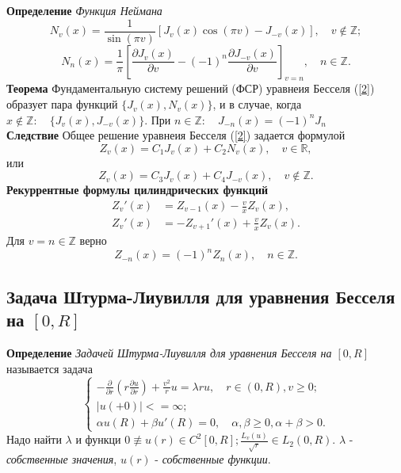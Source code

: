\documentclass{article}
\begin{document}
\noindent\textbf{Определение} \emph{Функция Неймана}
\begin{equation}
N_v(x)=\frac{1}{\sin(\pi v)}[J_v(x)\cos(\pi v)-J_{-v}(x)],\quad v\notin \mathbb{Z};
\end{equation}
\begin{equation}
N_n(x)=\frac{1}{\pi} \left[\frac{\partial J_v(x)}{\partial v}-(-1)^n\frac{\partial J_{-v}(x)}{\partial v}\right]_{v=n},\quad n\in\mathbb{Z}.
\end{equation}
\textbf{Теорема} Фундаментальную систему решений (ФСР) уравнеия Бесселя (\ref{2}) образует пара функций $\{J_v(x),N_v(x)\}$, и в случае, когда $x\notin \mathbb{Z}: \quad \{J_v(x),J_{-v}(x)\}$. При $n\in \mathbb{Z}:\quad J_{-n}(x)=(-1)^nJ_n$\\

\noindent\textbf{Следствие} Общее решение уравнеия Бесселя (\ref{2}) задается формулой
\begin{equation}
Z_v(x)=C_1J_v(x)+C_2N_v(x),\quad v\in\mathbb{R},
\end{equation}
или
\begin{equation}
Z_v(x)=C_3J_v(x)+C_4J_{-v}(x),\quad v\notin\mathbb{Z}.
\end{equation}
\textbf{Рекуррентные формулы цилиндрических функций} 
\begin{equation}
\begin{aligned}
Z_v'(x)&=Z_{v-1}(x)-\frac{v}{x}Z_v(x),\\
Z_v'(x)&=-Z_{v+1}'(x)+\frac{v}{x}Z_v(x).
\end{aligned}
\end{equation}
Для $v=n\in\mathbb{Z}$ верно
\begin{equation}
Z_{-n}(x)=(-1)^nZ_n(x),\quad n\in\mathbb{Z}.
\end{equation}

\subsection{Задача Штурма-Лиувилля для уравнения Бесселя на $[0,R]$}
\textbf{Определение} \emph{Задачей Штурма-Лиувилля для уравнения Бесселя на $[0,R]$} называется задача
\begin{equation}
\left\{\begin{array}{cc}
-\frac{\partial}{\partial r}\left( r\frac{\partial u}{\partial r}\right) + \frac{v^2}{r}u=\lambda ru,\quad r\in(0,R),v\ge 0;\\
|u(+0)|<=\infty;\\
\alpha u(R) +\beta u'(R)=0,\quad \alpha,\beta\ge 0,\alpha+\beta>0.
\end{array}\right.
\end{equation}
Надо найти $\lambda$ и функци $0\not\equiv u(r)\in C^2[0,R];\frac{L_v(u)}{\sqrt{r}}\in L_2(0,R)$. $\lambda$ - \emph{собственные значения}, $u(r)$ - \emph{собственные функции}. 
\end{document}
